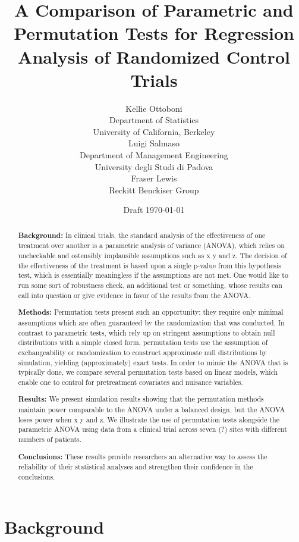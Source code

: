 \documentclass[11pt]{article}
\title{A Comparison of Parametric and Permutation Tests for Regression Analysis of Randomized Control Trials}
\author{Kellie Ottoboni \\
Department of Statistics\\
University of California, Berkeley\\ [.2in]
Luigi Salmaso\\
Department of Management Engineering \\
University degli Studi di Padova \\ [.2in]
Fraser Lewis \\
Reckitt Benckiser Group
}\date{Draft \today}
\begin{document}
\maketitle

\newpage

\begin{abstract}
\noindent\textbf{Background:}
In clinical trials, the standard analysis of the effectiveness of one treatment over another is a parametric analysis of variance (ANOVA), which relies on uncheckable and ostensibly implausible assumptions such as x y and z.
The decision of the effectiveness of the treatment is based upon a single p-value from this hypothesis test, which is essentially meaningless if the assumptions are not met.
One would like to run some sort of robustness check, an additional test or something, whose results can call into question or give evidence in favor of the results from the ANOVA.

\noindent\textbf{Methods:}
Permutation tests present such an opportunity: they require only minimal assumptions which are often guaranteed by the randomization that was conducted.
In contrast to parametric tests, which rely up on stringent assumptions to obtain null distributions with a simple closed form, permutation tests use the assumption of exchangeability or randomization to construct approximate null distributions by simulation, yielding (approximately) exact tests.
In order to mimic the ANOVA that is typically done, we compare several permutation tests based on linear models, which enable one to control for pretreatment covariates and nuisance variables.

\noindent\textbf{Results:}
We present simulation results showing that the permutation methods maintain power comparable to the ANOVA under a balanced design, but the ANOVA loses power when x y and z.
We illustrate the use of permutation tests alongside the parametric ANOVA using data from a clinical trial across seven (?) sites with different numbers of patients.

\noindent\textbf{Conclusions:}
These results provide researchers an alternative way to assess the reliability of their statistical analyses and strengthen their confidence in the conclusions.


\end{abstract}

\newpage

\section{Background}
\end{document}
